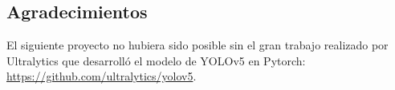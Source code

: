 \pagebreak

\subsection{Agradecimientos}

El siguiente proyecto no hubiera sido posible sin el gran trabajo
realizado por Ultralytics que desarrolló el modelo de YOLOv5 en
Pytorch: \url{https://github.com/ultralytics/yolov5}.